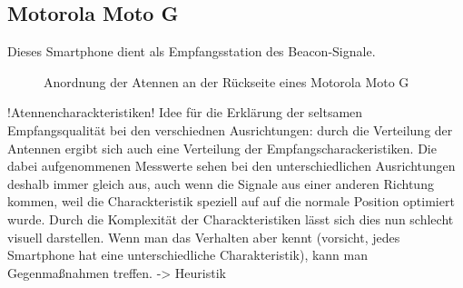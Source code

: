 \subsection{Motorola Moto G}
Dieses Smartphone dient als Empfangsstation des Beacon-Signale. 
\begin{figure}[H]
\centering
\caption{Anordnung der Atennen an der Rückseite eines Motorola Moto G  \cite{Moto}}
\label{fig:Moto}
\end{figure}

!Atennencharackteristiken! Idee für die Erklärung der seltsamen Empfangsqualität bei den verschiednen Ausrichtungen: durch die Verteilung der Antennen ergibt sich auch eine Verteilung der Empfangscharackeristiken. Die dabei aufgenommenen Messwerte sehen bei den unterschiedlichen Ausrichtungen deshalb immer gleich aus, auch wenn die Signale aus einer anderen Richtung kommen, weil die Charackteristik speziell auf auf die normale Position optimiert wurde. Durch die Komplexität der Charackteristiken lässt sich dies nun schlecht visuell darstellen. Wenn man das Verhalten aber kennt (vorsicht, jedes Smartphone hat eine unterschiedliche Charakteristik), kann man Gegenmaßnahmen treffen. -> Heuristik 
